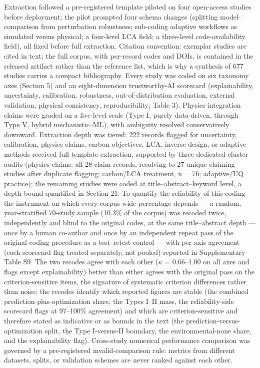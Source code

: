 \documentclass[pdflatex,sn-basic]{sn-jnl}
\begin{document}
Extraction followed a pre-registered template piloted on four open-access studies before deployment; the pilot prompted four schema changes (splitting model-comparison from perturbation robustness; sub-coding adaptive workflows as simulated versus physical; a four-level LCA field; a three-level code-availability field), all fixed before full extraction. Citation convention: exemplar studies are cited in text; the full corpus, with per-record codes and DOIs, is contained in the released artifact rather than the reference list, which is why a synthesis of 677 studies carries a compact bibliography. Every study was coded on six taxonomy axes (Section 5) and an eight-dimension trustworthy-AI scorecard (explainability, uncertainty, calibration, robustness, out-of-distribution evaluation, external validation, physical consistency, reproducibility; Table 3). Physics-integration claims were graded on a five-level scale (Type I, purely data-driven, through Type V, hybrid mechanistic--ML), with ambiguity resolved conservatively downward. Extraction depth was tiered: 222 records flagged for uncertainty, calibration, physics claims, carbon objectives, LCA, inverse design, or adaptive methods received full-template extraction, supported by three dedicated cluster audits (physics claims: all 28 claim records, resolving to 27 unique claiming studies after duplicate flagging; carbon/LCA treatment, n = 76; adaptive/UQ practice); the remaining studies were coded at title--abstract--keyword level, a depth bound quantified in Section 21. To quantify the reliability of this coding --- the instrument on which every corpus-wide percentage depends --- a random, year-stratified 70-study sample (10.3\% of the corpus) was recoded twice, independently and blind to the original codes, at the same title--abstract depth --- once by a human co-author and once by an independent repeat pass of the original coding procedure as a test--retest control --- with per-axis agreement (each scorecard flag treated separately, not pooled) reported in Supplementary Table S9. The two recodes agree with each other ($\kappa$ = 0.66--1.00 on all axes and flags except explainability) better than either agrees with the original pass on the criterion-sensitive items, the signature of systematic criterion differences rather than noise; the recodes identify which reported figures are stable (the combined prediction-plus-optimization share, the Types I--II mass, the reliability-side scorecard flags at 97--100\% agreement) and which are criterion-sensitive and therefore stated as indicative or as bounds in the text (the prediction-versus-optimization split, the Type I-versus-II boundary, the environmental-none share, and the explainability flag). Cross-study numerical performance comparison was governed by a pre-registered invalid-comparison rule: metrics from different datasets, splits, or validation schemes are never ranked against each other.
\end{document}
